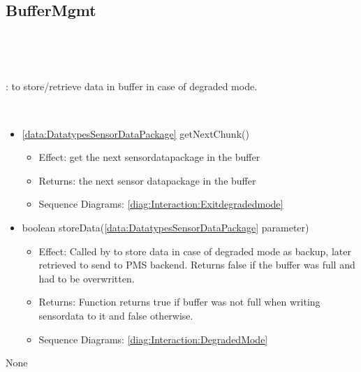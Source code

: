  \subsection{BufferMgmt}\label{int:InterfacesBufferMgmt}
    \begin{description}
      \item[Provided by:] \iconcomponent{}~
      \item[Required by:] \iconcomponent{}~ 
           \item[Description]: to store/retrieve data in buffer in case of degraded mode.
      \item[Operations:] ~
    \begin{itemize}[noitemsep,nolistsep,leftmargin=-.25cm]
      \item \textsf{\ref{data:DatatypesSensorDataPackage} getNextChunk()}
        \begin{itemize}[noitemsep,nolistsep]
           \item Effect: get the next sensordatapackage in the buffer 
           \item Returns: the next sensor datapackage in the buffer
           \item Sequence Diagrams: \cref{diag:Interaction:Exitdegradedmode}
        \end{itemize}
      \item \textsf{boolean storeData(\ref{data:DatatypesSensorDataPackage} parameter)}
        \begin{itemize}[noitemsep,nolistsep]
           \item Effect: Called by  to store data in case of degraded mode as backup, later retrieved to send to PMS backend. Returns false if the buffer was full and had to be overwritten. 
           \item Returns: Function returns true if buffer was not full when writing sensordata to it and false otherwise.
           \item Sequence Diagrams: \cref{diag:Interaction:DegradedMode}
        \end{itemize}
    \end{itemize}
      \item[Diagrams:] None
    \end{description}

